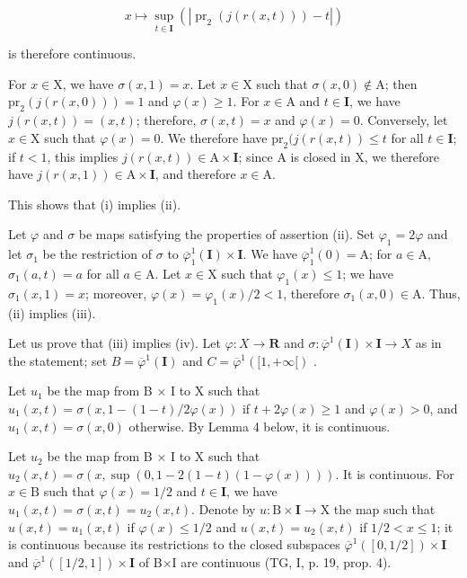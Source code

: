 \[
x \mapsto \sup _ {t \in \mathbf {I}} \left(\left| \operatorname{pr} _ {2} (j (r (x, t))) - t \right|\right)
\]

is therefore continuous.

For \(x \in \mathrm{X}\), we have \(\sigma(x,1) = x\). Let \(x \in \mathrm{X}\) such that \(\sigma(x,0) \notin \mathrm{A}\); then \(\mathrm{pr}_2(j(r(x,0))) = 1\) and \(\varphi(x) \geqslant 1\). For \(x \in \mathrm{A}\) and \(t \in \mathbf{I}\), we have \(j(r(x,t)) = (x,t)\); therefore, \(\sigma(x,t) = x\) and \(\varphi(x) = 0\). Conversely, let \(x \in \mathrm{X}\) such that \(\varphi(x) = 0\). We therefore have \(\mathrm{pr}_2(j(r(x,t)) \leqslant t\) for all \(t \in \mathbf{I}\); if \(t < 1\), this implies \(j(r(x,t)) \in \mathrm{A} \times \mathbf{I}\); since A is closed in X, we therefore have \(j(r(x,1)) \in \mathrm{A} \times \mathbf{I}\), and therefore \(x \in \mathrm{A}\).

This shows that (i) implies (ii).

Let \(\varphi\) and \(\sigma\) be maps satisfying the properties of assertion (ii). Set \(\varphi_1 = 2\varphi\) and let \(\sigma_1\) be the restriction of \(\sigma\) to \(\overline{\varphi}_1^1 (\mathbf{I})\times \mathbf{I}\). We have \(\overline{\varphi}_1^1 (0) = \mathrm{A}\); for \(a\in \mathrm{A}\), \(\sigma_1(a,t) = a\) for all \(a\in \mathrm{A}\). Let \(x\in \mathrm{X}\) such that \(\varphi_{1}(x)\leqslant 1\); we have \(\sigma_1(x,1) = x\); moreover, \(\varphi (x) = \varphi_{1}(x) / 2 < 1\), therefore \(\sigma_{1}(x,0)\in \mathrm{A}\). Thus, (ii) implies (iii).

Let us prove that (iii) implies (iv). Let \(\varphi\colon X\to\mathbf{R}\) and \(\sigma\colon\overline{\varphi}^{1}(\mathbf{I})\times\mathbf{I}\to X\) as in the statement; set \(B=\overline{\varphi}^{1}(\mathbf{I})\) and \(C=\overline{\varphi}^{1}([1,+\infty[)\) .

Let \(u_1\) be the map from B × I to X such that \(u_1(x,t) = \sigma(x,1 - (1 - t)/2\varphi(x))\) if \(t + 2\varphi(x) \geqslant 1\) and \(\varphi(x) > 0\), and \(u_1(x,t) = \sigma(x,0)\) otherwise. By Lemma 4 below, it is continuous.

Let \(u_2\) be the map from B × I to X such that \(u_2(x,t)=\sigma(x,\sup(0,1-2(1-t)(1-\varphi(x))))\). It is continuous. For \(x\in\mathrm{B}\) such that \(\varphi(x)=1/2\) and \(t\in\mathbf{I}\), we have \(u_1(x,t)=\sigma(x,t)=u_2(x,t)\). Denote by \(u:\mathrm{B}\times\mathbf{I}\to\mathrm{X}\) the map such that \(u(x,t)=u_1(x,t)\) if \(\varphi(x)\leqslant1/2\) and \(u(x,t)=u_2(x,t)\) if \(1/2<x\leqslant1\); it is continuous because its restrictions to the closed subspaces \(\overline{\varphi}^{1}([0,1/2])\times\mathbf{I}\) and \(\overline{\varphi}^{1}([1/2,1])\times\mathbf{I}\) of B×I are continuous (TG, I, p. 19, prop. 4).

